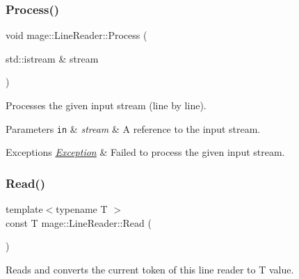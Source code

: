 \mbox{\label{classmage_1_1_line_reader_ad351b7c68e5784d0dca690a5b8fe7528}} 
\subsubsection{\texorpdfstring{Process()}{Process()}}
{\footnotesize\ttfamily void mage\+::\+Line\+Reader\+::\+Process (\begin{DoxyParamCaption}\item[{std\+::istream \&}]{stream }\end{DoxyParamCaption})\hspace{0.3cm}{\ttfamily [private]}}

Processes the given input stream (line by line).


\begin{DoxyParams}[1]{Parameters}
\mbox{\tt in}  & {\em stream} & A reference to the input stream. \\
\hline
\end{DoxyParams}

\begin{DoxyExceptions}{Exceptions}
{\em \mbox{\hyperlink{classmage_1_1_exception}{Exception}}} & Failed to process the given input stream. \\
\hline
\end{DoxyExceptions}
\mbox{\label{classmage_1_1_line_reader_a9bbad433ab93ce012aec7155adafbedb}} 
\subsubsection{\texorpdfstring{Read()}{Read()}\hspace{0.1cm}{\footnotesize\ttfamily [1/2]}}
{\footnotesize\ttfamily template$<$typename T $>$ \\
const T mage\+::\+Line\+Reader\+::\+Read (\begin{DoxyParamCaption}{ }\end{DoxyParamCaption})\hspace{0.3cm}{\ttfamily [protected]}}

Reads and converts the current token of this line reader to {\ttfamily T} value.


